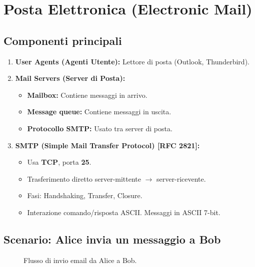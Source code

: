 \documentclass{article}
\begin{document}
\section{Posta Elettronica (Electronic Mail)}
\subsection{Componenti principali}
\begin{enumerate}
    \item \textbf{User Agents (Agenti Utente):} Lettore di posta (Outlook, Thunderbird).
    \item \textbf{Mail Servers (Server di Posta):}
    \begin{itemize}
        \item \textbf{Mailbox:} Contiene messaggi in arrivo.
        \item \textbf{Message queue:} Contiene messaggi in uscita.
        \item \textbf{Protocollo SMTP:} Usato tra server di posta.
    \end{itemize}
    \item \textbf{SMTP (Simple Mail Transfer Protocol) [RFC 2821]:}
    \begin{itemize}
        \item Usa \textbf{TCP}, porta \textbf{25}.
        \item Trasferimento diretto server-mittente $\rightarrow$ server-ricevente.
        \item Fasi: Handshaking, Transfer, Closure.
        \item Interazione comando/risposta ASCII. Messaggi in ASCII 7-bit.
    \end{itemize}
\end{enumerate}

\subsection{Scenario: Alice invia un messaggio a Bob}
\begin{figure}[H]
\centering
{}
\caption{Flusso di invio email da Alice a Bob.}
\end{figure}
\end{document}
